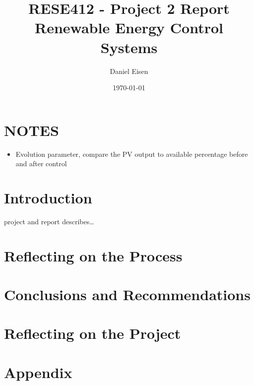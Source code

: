 \documentclass[journal]{IEEEtran}
\title{RESE412 - Project 2 Report \\ Renewable Energy Control Systems}
\author{Daniel Eisen}
\date{\today}
\begin{document}
\onecolumn
\maketitle
\tableofcontents

\section*{NOTES}
\begin{itemize}
    \item Evolution parameter, compare the PV output to available percentage before and after control
\end{itemize}

\twocolumn
\section{Introduction}
 project and report describes\dots
\section{Reflecting on the Process}
\section{Conclusions and Recommendations}
\section{Reflecting on the Project} 


\newpage
\onecolumn
\appendices
        \section{Appendix}
        \label{ap:label}

\newpage
\nocite{*}


\end{document}
